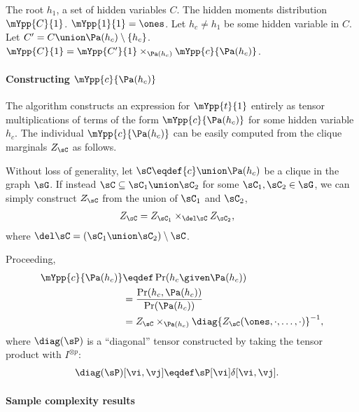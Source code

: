 \begin{algorithm}
  \caption{$\mYpp{C}{1}$}
  \label{algo:Y}
  \begin{algorithmic}
    \REQUIRE The root $h_1$, a set of hidden variables $C$.
    \ENSURE The hidden moments distribution $\mYpp{C}{1}$.
      \STATE $\mYpp{1}{1} = \ones$.
    \ELSE
      \STATE Let $h_c \neq h_1$ be some hidden variable in $C$.
      \STATE Let $C' = C \union \Pa(h_c) \setminus \{h_c\}$.
      \STATE $\mYpp{C}{1} = \mYpp{C'}{1} \times_{\Pa(h_c)} \mYpp{c}{\Pa(h_c)}$.
    \ENDIF
  \end{algorithmic}
\end{algorithm}

\paragraph{Constructing $\mYpp{c}{\Pa(h_c)}$}

The algorithm constructs an expression for $\mYpp{t}{1}$ entirely as
  tensor multiplications of terms of the form $\mYpp{c}{\Pa(h_c)}$ for
  some hidden variable $h_c$. 
The individual $\mYpp{c}{\Pa(h_c)}$ can be easily computed from the
  clique marginals $Z_\sC$ as follows.

Without loss of generality, let $\sC \eqdef \{c\} \union \Pa(h_c)$ be a clique
  in the graph $\sG$.
If instead $\sC \subseteq \sC_1 \union \sC_2$ for some $\sC_1, \sC_2 \in
  \sG$, we can simply construct $Z_{\sC}$ from the union of $\sC_1$ and
  $\sC_2$,
\begin{align*}
  Z_\sC &= Z_{\sC_1} \times_{\del \sC} Z_{\sC_2},
\end{align*}
where $\del \sC = (\sC_1 \union \sC_2) \setminus \sC$.

Proceeding,
\begin{align*}
\mYpp{c}{\Pa(h_c)} 
  &\eqdef \Pr(h_c \given \Pa(h_c)) \\
  &= \frac{\Pr(h_c, \Pa(h_c))}{\Pr(\Pa(h_c))} \\
  &= Z_\sC \times_{\Pa(h_c)} \diag{Z_\sC(\ones, \cdot, \ldots, \cdot)}^{-1},
\end{align*}
where $\diag(\sP)$ is a ``diagonal'' tensor constructed by taking the
tensor product with $I^{\otimes p}$:
\begin{align*}
  \diag(\sP)[\vi,\vj] &\eqdef \sP[\vi] \delta[\vi,\vj].
\end{align*}

\paragraph{Sample complexity results}

